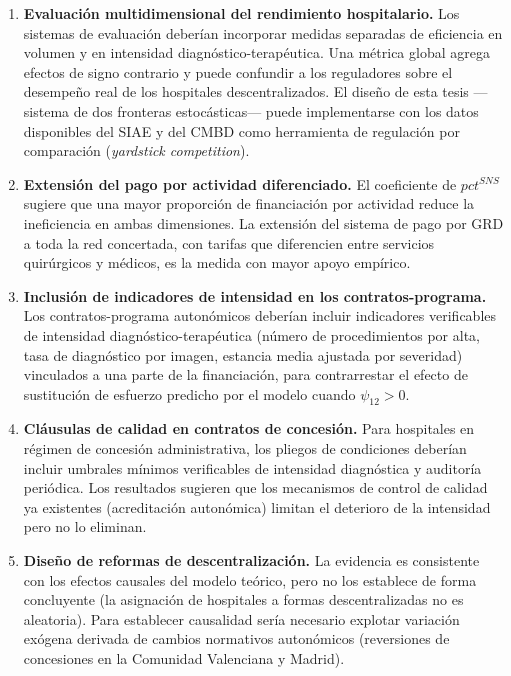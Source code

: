 \documentclass[12pt, a4paper]{article}
\begin{document}
\begin{enumerate}[label=\textbf{\arabic*.}, leftmargin=*]

  \item \textbf{Evaluación multidimensional del rendimiento hospitalario.} Los
    sistemas de evaluación deberían incorporar medidas separadas de eficiencia
    en volumen y en intensidad diagnóstico-terapéutica. Una métrica global agrega
    efectos de signo contrario y puede confundir a los reguladores sobre el
    desempeño real de los hospitales descentralizados. El diseño de esta tesis
    ---sistema de dos fronteras estocásticas--- puede implementarse con los datos
    disponibles del SIAE y del CMBD como herramienta de regulación por
    comparación (\textit{yardstick competition}).

  \item \textbf{Extensión del pago por actividad diferenciado.} El coeficiente
    de $pct^{SNS}$ sugiere que una mayor proporción de financiación por
    actividad reduce la ineficiencia en ambas dimensiones. La extensión del
    sistema de pago por GRD a toda la red concertada, con tarifas que
    diferencien entre servicios quirúrgicos y médicos, es la medida con mayor
    apoyo empírico.

  \item \textbf{Inclusión de indicadores de intensidad en los
    contratos-programa.} Los contratos-programa autonómicos deberían incluir
    indicadores verificables de intensidad diagnóstico-terapéutica (número de
    procedimientos por alta, tasa de diagnóstico por imagen, estancia media
    ajustada por severidad) vinculados a una parte de la financiación, para
    contrarrestar el efecto de sustitución de esfuerzo predicho por el modelo
    cuando $\psi_{12}>0$.

  \item \textbf{Cláusulas de calidad en contratos de concesión.} Para
    hospitales en régimen de concesión administrativa, los pliegos de
    condiciones deberían incluir umbrales mínimos verificables de intensidad
    diagnóstica y auditoría periódica. Los resultados sugieren que los
    mecanismos de control de calidad ya existentes (acreditación autonómica)
    limitan el deterioro de la intensidad pero no lo eliminan.

  \item \textbf{Diseño de reformas de descentralización.} La evidencia es
    consistente con los efectos causales del modelo teórico, pero no los
    establece de forma concluyente (la asignación de hospitales a formas
    descentralizadas no es aleatoria). Para establecer causalidad sería
    necesario explotar variación exógena derivada de cambios normativos
    autonómicos (reversiones de concesiones en la Comunidad Valenciana y
    Madrid).

\end{enumerate}
\end{document}
